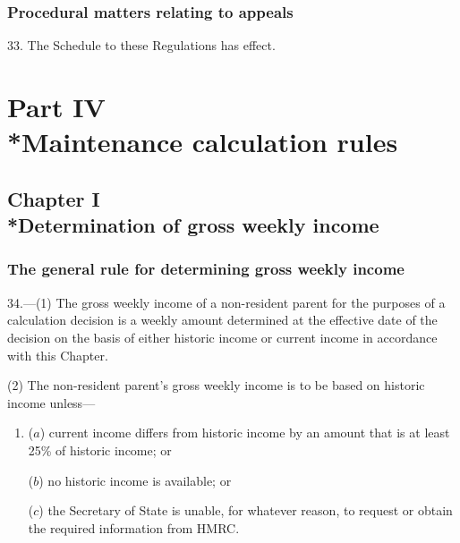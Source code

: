 \documentclass[12pt,a4paper]{article}
\begin{document}
\subsubsection[33. Procedural matters relating to appeals]{Procedural matters relating to appeals}

33.  The Schedule to these Regulations has effect.

\section[Part IV --- Maintenance calculation rules]{Part IV\\*Maintenance calculation rules}

\subsection[Chapter I --- Determination of gross weekly income]{Chapter I\\*Determination of gross weekly income}

\renewcommand\parthead{--- Part IV Chapter I}

\subsubsection[34. The general rule for determining gross weekly income]{The general rule for determining gross weekly income}

34.---(1)  The gross weekly income of a non-resident parent for the purposes of a calculation decision is a weekly amount determined at the effective date of the decision on the basis of either historic income or current income in accordance with this Chapter.

(2) The non-resident parent’s gross weekly income is to be based on historic income unless—
\begin{enumerate}\item[]
($a$) current income differs from historic income by an amount that is at least 25\% of historic income; or

($b$) 
no historic income is available;
%
or

($c$) the Secretary of State is unable, for whatever reason, to request or obtain the required information from HMRC.
\end{enumerate}
\end{document}
